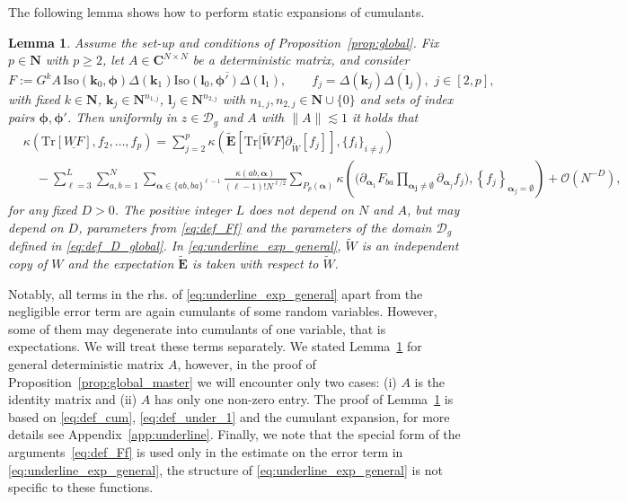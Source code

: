 \documentclass[10pt]{amsart}
\newtheorem{lemma}[theorem]{Lemma}
\numberwithin{equation}{section}
\newcommand{\E}{\mathbf{E}}
\newcommand{\C}{\mathbf{C}}
\newcommand{\N}{\mathbf{N}}
\begin{document}
The following lemma shows how to perform static expansions of cumulants. 

\begin{lemma}\label{lem:underline_exp_general} Assume the set-up and conditions of Proposition~\ref{prop:global}. Fix $p\in\N$ with $p\ge 2$, let $A\in\C^{N\times N}$  be a deterministic matrix, and consider
\begin{equation}
F:=G^kA\,\mathrm{Iso}(\bm{k}_0,\bm{\phi})\Delta(\bm{k}_1)\overline{\mathrm{Iso}(\bm{l}_0,\bm{\phi}')\Delta(\bm{l}_1)},\qquad f_j=\Delta(\bm{k}_j)\overline{\Delta(\bm{l}_j)}, \, \, j\in [2,p],
\label{eq:def_Ff}
\end{equation}
with fixed $k\in \N$, $\bm{k}_j\in\N^{n_{1,j}}$, $\bm{l}_j\in \N^{n_{2,j}}$ with $n_{1,j},n_{2,j}\in\N\cup\{0\}$ and sets of index pairs $\bm{\phi},\bm{\phi}'$. Then uniformly in $z\in\mathcal{D}_g$ and $A$ with $\|A\|\lesssim 1$ it holds that    
\begin{equation}
\begin{split}
&\kappa\left(\mathrm{Tr}\left[\underline{WF}\right] ,f_2,\ldots,f_p\right) =\sum_{j=2}^p \kappa\left(\widetilde{\E}\left[\mathrm{Tr}\big[\widetilde{W}F\big]\partial_{\widetilde{W}}[f_j]\right],\{f_i\}_{i\neq j}\right)\\
&\quad -\sum_{\ell=3}^L \sum_{a,b=1}^N \sum_{\bm{\alpha}\in\{ab,ba\}^{\ell-1}}\frac{\kappa(ab,\bm{\alpha})}{(\ell-1)!N^{\ell/2}}\sum_{P_p(\bm{\alpha})}\kappa\left(\Bigg(\partial_{\bm{\alpha}_1}F_{ba} \prod_{\bm{\alpha_j}\neq\emptyset} \partial_{\bm{\alpha}_j}f_j\Bigg),\left\lbrace f_j\right\rbrace_{\bm{\alpha}_j=\emptyset}\right) + \mathcal{O}\left(N^{-D}\right),
\end{split}
\label{eq:underline_exp_general}
\end{equation}
for any fixed $D>0$. The positive integer $L$ does not depend on $N$ and $A$, but may depend on $D$, parameters from \eqref{eq:def_Ff} and the parameters of the domain $\mathcal{D}_g$ defined in \eqref{eq:def_D_global}. In \eqref{eq:underline_exp_general}, $\widetilde{W}$ is an independent copy of $W$ and the expectation $\widetilde{\E}$ is taken with respect to $\widetilde{W}$. 
\end{lemma}

Notably, all terms in the rhs. of \eqref{eq:underline_exp_general} apart from the negligible error term are again cumulants of some random variables. However, some of them may degenerate into cumulants of one variable, that is expectations. We will treat these terms separately. We stated Lemma~\ref{lem:underline_exp_general} for general deterministic matrix $A$, however, in the proof of Proposition~\ref{prop:global_master} we will encounter only two cases: (i) $A$ is the identity matrix and (ii) $A$ has only one non-zero entry. The proof of Lemma~\ref{lem:underline_exp_general} is based on \eqref{eq:def_cum}, \eqref{eq:def_under_1} and the cumulant expansion, for more details see Appendix~\ref{app:underline}. Finally, we note that the special form of the arguments~\eqref{eq:def_Ff} is used only in the estimate on the error term in \eqref{eq:underline_exp_general}, the structure of \eqref{eq:underline_exp_general} is not specific to these functions.
\end{document}
